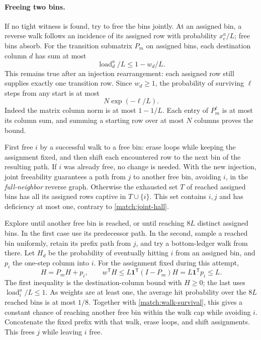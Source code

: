 \paragraph{Freeing two bins.}
If no tight witness is found, try to free the bins jointly.
At an assigned bin, a reverse walk follows an incidence of its
assigned row with probability \(x^a_e/L\); free bins absorb.
For the transition submatrix \(P_m\) on assigned bins, each
destination column \(d\) has sum at most
\[
                  \operatorname{load}^a_d/L\le1-w_d/L.
\]
This remains true after an injection rearrangement: each assigned
row still supplies exactly one transition row.  Since \(w_d\ge1\),
the probability of surviving \(\ell\) steps from any start is at most
\begin{equation}
                              N\exp(-\ell/L).
 \label{match:walk-survival}
\end{equation}
Indeed the matrix column norm is at most \(1-1/L\).
Each entry of \(P_m^\ell\) is at most its column sum, and summing
a starting row over at most \(N\) columns proves the bound.

First free \(i\) by a successful walk to a free bin: erase loops
while keeping the assignment fixed, and then shift each encountered
row to the next bin of the resulting path.  If \(i\) was already
free, no change is needed.  With the new injection, joint freeability
guarantees a path from \(j\) to another free bin, avoiding \(i\),
in the \emph{full-neighbor} reverse graph.  Otherwise the exhausted
set \(T\) of reached assigned bins has all its assigned rows captive
in \(T\cup\{i\}\).  This set contains \(i,j\) and has deficiency at
most one, contrary to \eqref{match:joint-hall}.

Explore until another free bin is reached, or until reaching \(8L\)
distinct assigned bins.  In the first case use its predecessor path.
In the second, sample a reached bin uniformly, retain its prefix
path from \(j\), and try a bottom-ledger walk from there.
Let \(H_d\) be the probability of eventually hitting \(i\) from an
assigned bin, and \(p_i\) the one-step column into \(i\).
For the assignment fixed during this attempt,
\begin{equation}
 H=P_mH+p_i,\qquad
 w^{\mathsf T}H\le L\boldsymbol1^{\mathsf T}(I-P_m)H
       =L\boldsymbol1^{\mathsf T}p_i\le L.
 \label{match:avoid-first-free}
\end{equation}
The first inequality is the destination-column bound with \(H\ge0\);
the last uses \(\operatorname{load}^a_i/L\le1\).
As weights are at least one, the average hit probability over
the \(8L\) reached bins is at most \(1/8\).
Together with \eqref{match:walk-survival}, this gives a constant
chance of reaching another free bin within the walk cap while
avoiding \(i\).  Concatenate the fixed prefix with that walk,
erase loops, and shift assignments.  This frees \(j\) while
leaving \(i\) free.

